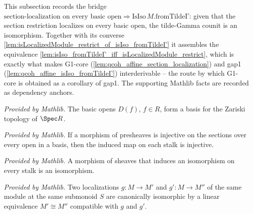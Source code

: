 This subsection records the bridge \(\text{section-localization on every basic open} \Rightarrow
\mathrm{IsIso}\,M.\mathrm{fromTildeΓ}\): given that the section restriction localizes on every basic
open, the tilde-Gamma counit is an isomorphism. Together with its converse
\cref{lem:isLocalizedModule_restrict_of_isIso_fromTildeΓ} it assembles the equivalence
\cref{lem:isIso_fromTildeΓ_iff_isLocalizedModule_restrict}, which is exactly what makes G1-core
(\cref{lem:qcoh_affine_section_localization}) and gap1
(\cref{lem:qcoh_affine_isIso_fromTildeΓ}) interderivable -- the route by which G1-core is obtained as
a corollary of gap1. The supporting Mathlib facts are recorded as dependency anchors.


\begin{lemma}
  \label{lem:isBasis_basic_opens_mathlib}
  \mathlibok
  \textit{Provided by Mathlib.}
  The basic opens \(D(f)\), \(f \in R\), form a basis for the Zariski topology of \(\Spec R\).
\end{lemma}

\begin{lemma}
  \label{lem:stalkFunctor_map_injective_of_isBasis_mathlib}
  \mathlibok
  \textit{Provided by Mathlib.}
  If a morphism of presheaves is injective on the sections over every open in a basis, then the
  induced map on each stalk is injective.
\end{lemma}

\begin{lemma}
  \label{lem:isIso_of_stalkFunctor_map_iso_mathlib}
  \mathlibok
  \textit{Provided by Mathlib.}
  A morphism of sheaves that induces an isomorphism on every stalk is an isomorphism.
\end{lemma}

\begin{lemma}
  \label{lem:isLocalizedModule_linearEquiv_mathlib}
  \mathlibok
  \textit{Provided by Mathlib.}
  Two localizations \(g : M \to M'\) and \(g' : M \to M''\) of the same module at the same submonoid
  \(S\) are canonically isomorphic by a linear equivalence \(M' \cong M''\) compatible with \(g\)
  and \(g'\).
\end{lemma}

